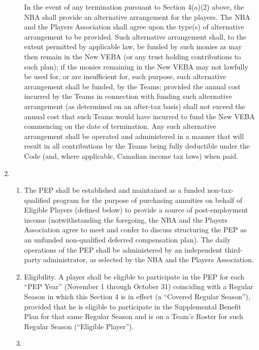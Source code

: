 \documentclass[
]{book}
\providecommand{\tightlist}{%
  \setlength{\itemsep}{0pt}\setlength{\parskip}{0pt}}
\begin{document}
\begin{enumerate}
\begin{enumerate}
    In the event of any termination pursuant to Section 4(a)(2) above, the NBA shall provide an alternative arrangement for the players. The NBA and the Players Association shall agree upon the type(s) of alternative arrangement to be provided. Such alternative arrangement shall, to the extent permitted by applicable law, be funded by such monies as may then remain in the New VEBA (or any trust holding contributions to such plan); if the monies remaining in the New VEBA may not lawfully be used for, or are insufficient for, such purpose, such alternative arrangement shall be funded, by the Teams; provided the annual cost incurred by the Teams in connection with funding such alternative arrangement (as determined on an after-tax basis) shall not exceed the annual cost that such Teams would have incurred to fund the New VEBA commencing on the date of termination. Any such alternative arrangement shall be operated and administered in a manner that will result in all contributions by the Teams being fully deductible under the Code (and, where applicable, Canadian income tax laws) when paid.
  \end{enumerate}
\item
  \begin{enumerate}
  \def\labelenumii{(\arabic{enumii})}
  \tightlist
  \item
    The PEP shall be established and maintained as a funded non-tax-qualified program for the purpose of purchasing annuities on behalf of Eligible Players (defined below) to provide a source of post-employment income (notwithstanding the foregoing, the NBA and the Players Association agree to meet and confer to discuss structuring the PEP as an unfunded non-qualified deferred compensation plan). The daily operations of the PEP shall be administered by an independent third-party administrator, as selected by the NBA and the Players Association.
  \item
    Eligibility. A player shall be eligible to participate in the PEP for each ``PEP Year'' (November 1 through October 31) coinciding with a Regular Season in which this Section 4 is in effect (a ``Covered Regular Season''), provided that he is eligible to participate in the Supplemental Benefit Plan for that same Regular Season and is on a Team's Roster for such Regular Season (``Eligible Player'').
  \item

\end{enumerate}
\end{enumerate}
\end{document}
